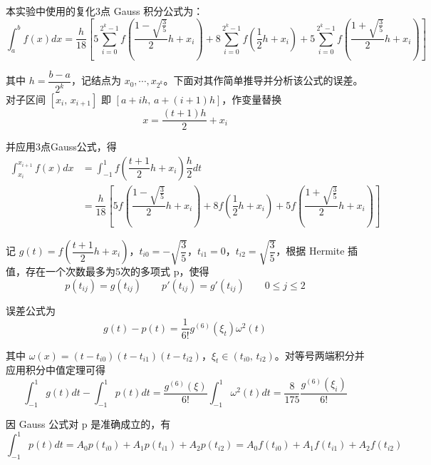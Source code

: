 \documentclass{ctexart}
\begin{document}
	本实验中使用的复化3点 Gauss 积分公式为：
	\begin{equation*}
		\int_a^b f(x)dx = \dfrac{h}{18} \left[5 \sum_{i = 0}^{2^k - 1} f\left(\dfrac{1 - \sqrt{\frac{3}{5}}}{2} h + x_i\right) + 8 \sum_{i = 0}^{2^k - 1} f\left(\dfrac{1}{2} h + x_i\right) + 5 \sum_{i = 0}^{2^k - 1} f\left(\dfrac{1 + \sqrt{\frac{3}{5}}}{2} h + x_i\right)\right]
	\end{equation*}
	
	其中 $h = \dfrac{b - a}{2^k}$，记结点为 $x_0, \cdots, x_{2^k}$。下面对其作简单推导并分析该公式的误差。对子区间 $[x_{i},\,x_{i+1}]$ 即 $[a + ih,\, a + (i+1)h]$，作变量替换
	\begin{equation}
		x = \dfrac{(t + 1)h}{2} + x_i
	\end{equation}
	
	并应用3点Gauss公式，得
	\begin{equation}
	\label{Gauss_Formula}
	\begin{aligned}
		\int_{x_i}^{x_{i+1}} f(x) dx & = \int_{-1}^{1} f(\dfrac{t + 1}{2} h + x_i) \dfrac{h}{2}dt\\
		& = \dfrac{h}{18}\left[5 f\left(\dfrac{1 - \sqrt{\frac{3}{5}}}{2} h + x_i\right) + 8 f\left(\dfrac{1}{2} h + x_i\right) + 5 f\left(\dfrac{1 + \sqrt{\frac{3}{5}}}{2} h + x_i\right)\right]
	\end{aligned}
	\end{equation}
	
	记 $ g(t) = f(\dfrac{t + 1}{2} h + x_i)$，$t_{i0} = -\sqrt{\dfrac{3}{5}}$，$t_{i1} = 0$，$t_{i2} = \sqrt{\dfrac{3}{5}}$，根据 Hermite 插值，存在一个次数最多为5次的多项式 p，使得
	\begin{equation}
		p(t_{ij}) = g(t_{ij}) \qquad p'(t_{ij}) = g'(t_{ij}) \qquad 0 \leqslant j \leqslant 2
	\end{equation}
	
	误差公式为
	\begin{equation}
		g(t) - p(t) = \dfrac{1}{6!} g^{(6)}(\xi_t)\omega^2(t)
	\end{equation}
	
	其中 $\omega(x) = (t - t_{i0})(t - t_{i1})(t - t_{i2})$，$\xi_t \in (t_{i0},\,t_{i2})$。对等号两端积分并应用积分中值定理可得
	\begin{equation}
		\int_{-1}^{1} g(t) dt - \int_{-1}^{1} p(t) dt = \dfrac{g^{(6)}(\xi)}{6!} \int_{-1}^{1} \omega^2(t) dt = \dfrac{8}{175}\dfrac{g^{(6)}(\xi_i)}{6!}
	\end{equation}
	
	因 Gauss 公式对 p 是准确成立的，有
	\begin{equation}
		\int_{-1}^{1} p(t) dt = A_0 p(t_{i0}) + A_1 p(t_{i1}) + A_2 p(t_{i2}) = A_0 f(t_{i0}) + A_1 f(t_{i1}) + A_2 f(t_{i2})
	\end{equation}
	
\end{document}

